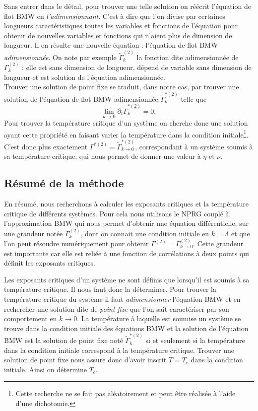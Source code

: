 \documentclass[10.5pt]{article}
\begin{document}
\begin{multicols*}{2}
Sans entrer dans le détail, pour trouver une telle solution on réécrit l'équation de flot BMW en \textit{l'adimensionnant}. C'est à dire que l'on divise par certaines longueurs caractéristiques toutes les variables et fonctions de l'équation pour obtenir de nouvelles variables et fonctions qui n'aient plus de dimension de longueur. Il en résulte une nouvelle équation : l'équation de flot BMW \textit{adimensionnée}. On note par exemple $\tilde{\Gamma}_k^{(2)}$ la fonction dite adimensionnée de $\Gamma_k^{(2)}$ : elle est sans dimension de longueur, dépend de variable sans dimension de longueur et est solution de l'équation adimensionnée. \\
\indent
Trouver une solution de point fixe se traduit, dans notre cas, par trouver une solution de l'équation de flot BMW adimensionnée $\tilde{\Gamma}^{*(2)}_k$ telle que
\begin{equation}
\lim\limits_{k \to 0} \partial_t \tilde{\Gamma}^{*(2)}_k = 0,
\label{eq:ptFixe}
\end{equation}
Pour trouver la température critique d'un système on cherche donc une solution ayant cette propriété en faisant varier la température dans la condition initiale\footnote{Cette recherche ne se fait pas aléatoirement et peut être réalisée à l'aide d'une dichotomie.}. C'est donc plus exactement $\Gamma^{*(2)} = \tilde{\Gamma}^{*(2)}_{k \to 0}$, correspondant à un système soumis à sa température critique, qui nous permet de donner une valeur à $\eta$ et $\nu$. \\






\subsection{Résumé de la méthode}

En résumé, nous recherchons à calculer les exposants critiques et la température critique de différents systèmes. Pour cela nous utilisons le NPRG couplé à l'approximation BMW qui nous permet d'obtenir une équation différentielle, sur une grandeur notée $\Gamma^{(2)}_k$, dont on connait une condition initiale en $k = \Lambda$ et que l'on peut résoudre numériquement pour obtenir $\Gamma^{(2)} = \Gamma^{(2)}_{k \to 0}$. Cette grandeur est importante car elle est reliée à une fonction de corrélations à deux points qui définit les exposants critiques.

Les exposants critiques d'un système ne sont définis que lorsqu'il est soumis à sa température critique. Il nous faut donc la déterminer. Pour trouver la température critique du système il faut \textit{adimensionner} l'équation BMW et en rechercher une solution dite de \textit{point fixe} que l'on sait caractériser par son comportement en $k \to 0$. La température à laquelle est soumise un système se trouve dans la condition initiale des équations BMW et la solution de l'équation BMW est la solution de point fixe noté $\tilde{\Gamma}^{* (2)}_k$ si et seulement si la température dans la condition initiale correspond à la température critique. Trouver une solution de point fixe nous assure donc d'avoir inscrit $T=T_c$ dans la condition initiale. Ainsi on détermine $T_c$.


\end{multicols*}
\end{document}
